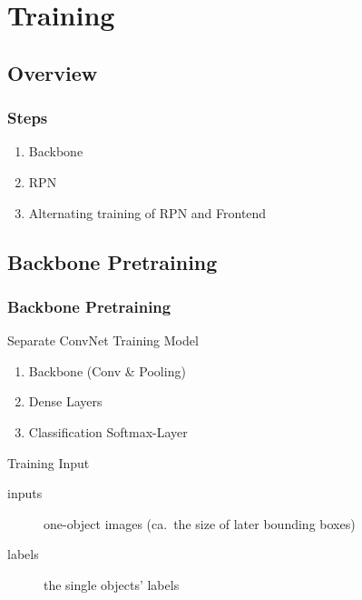 \section{Training}
\subsection{Overview}
\begin{frame}[<+->]
  \frametitle<presentation>{Steps}
  \begin{enumerate}
  \item Backbone
  \item RPN
  \item Alternating training of RPN and Frontend
  \end{enumerate}
\end{frame}

\subsection{Backbone Pretraining}\label{backbonetraining}
\begin{frame}[t]
  \frametitle<presentation>{Backbone Pretraining}
  \begin{block}{Separate ConvNet Training Model}
    \begin{enumerate}
    \item Backbone (Conv \& Pooling)
    \item Dense Layers
    \item Classification Softmax-Layer
    \end{enumerate}
  \end{block}

  \begin{block}{Training Input}
    \begin{description}
    \item[inputs] one-object images
      (ca.\ the size of later bounding boxes)
    \item[labels] the single objects' labels
    \end{description}
  \end{block}
\end{frame}

